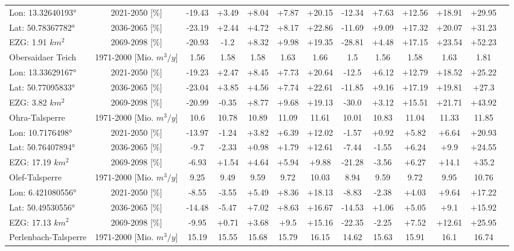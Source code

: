 \begin{longtable}{@{\extracolsep{\fill}}lc|ccccc||cccccc}
\cline{2-12} 
Lon: 13.32640193° & 2021-2050 [\%]  & -19.43 & +3.49 & +8.04 & +7.87 & +20.15 & -12.34 & +7.63 & +12.56 & +18.91 & +29.95\\ 
Lat: 50.78367782° & 2036-2065 [\%]  & -23.19 & +2.44 & +4.72 & +8.17 & +22.86 & -11.69 & +9.09 & +17.32 & +20.07 & +31.23\\ 
EZG: 1.91 $km^2$ & 2069-2098 [\%]  & -20.93 & -1.2 & +8.32 & +9.98 & +19.35 & -28.81 & +4.48 & +17.15 & +23.54 & +52.23\\ 
\hline 
Obersaidaer Teich & 1971-2000 [Mio. $m^3/y$]  & 1.56 & 1.58 & 1.58 & 1.63 & 1.66 & 1.5 & 1.56 & 1.58 & 1.63 & 1.81\\ 
\cline{2-12} 
Lon: 13.33629167° & 2021-2050 [\%]  & -19.23 & +2.47 & +8.45 & +7.73 & +20.64 & -12.5 & +6.12 & +12.79 & +18.52 & +25.22\\ 
Lat: 50.77095833° & 2036-2065 [\%]  & -23.04 & +3.85 & +4.56 & +7.74 & +22.61 & -11.85 & +9.16 & +17.19 & +19.81 & +27.3\\ 
EZG: 3.82 $km^2$ & 2069-2098 [\%]  & -20.99 & -0.35 & +8.77 & +9.68 & +19.13 & -30.0 & +3.12 & +15.51 & +21.71 & +43.92\\ 
\hline 
Ohra-Talsperre & 1971-2000 [Mio. $m^3/y$]  & 10.6 & 10.78 & 10.89 & 11.09 & 11.61 & 10.01 & 10.83 & 11.04 & 11.33 & 11.85\\ 
\cline{2-12} 
Lon: 10.7176498° & 2021-2050 [\%]  & -13.97 & -1.24 & +3.82 & +6.39 & +12.02 & -1.57 & +0.92 & +5.82 & +6.64 & +20.93\\ 
Lat: 50.76407894° & 2036-2065 [\%]  & -9.7 & -2.33 & +0.98 & +1.79 & +12.61 & -7.44 & -1.55 & +6.24 & +9.9 & +24.55\\ 
EZG: 17.19 $km^2$ & 2069-2098 [\%]  & -6.93 & +1.54 & +4.64 & +5.94 & +9.88 & -21.28 & -3.56 & +6.27 & +14.1 & +35.2\\ 
\hline 
Olef-Talsperre & 1971-2000 [Mio. $m^3/y$]  & 9.25 & 9.49 & 9.59 & 9.72 & 10.03 & 8.94 & 9.59 & 9.72 & 9.95 & 10.76\\ 
\cline{2-12} 
Lon: 6.421080556° & 2021-2050 [\%]  & -8.55 & -3.55 & +5.49 & +8.36 & +18.13 & -8.83 & -2.38 & +4.03 & +9.64 & +17.22\\ 
Lat: 50.49530556° & 2036-2065 [\%]  & -14.48 & -5.47 & +7.02 & +8.63 & +16.67 & -14.53 & +1.06 & +5.05 & +9.1 & +15.92\\ 
EZG: 17.13 $km^2$ & 2069-2098 [\%]  & -9.95 & +0.71 & +3.68 & +9.5 & +15.16 & -22.35 & -2.25 & +7.52 & +12.61 & +25.95\\ 
\hline 
Perlenbach-Talsperre & 1971-2000 [Mio. $m^3/y$]  & 15.19 & 15.55 & 15.68 & 15.79 & 16.15 & 14.62 & 15.63 & 15.91 & 16.1 & 16.74\\ 

\end{longtable}
